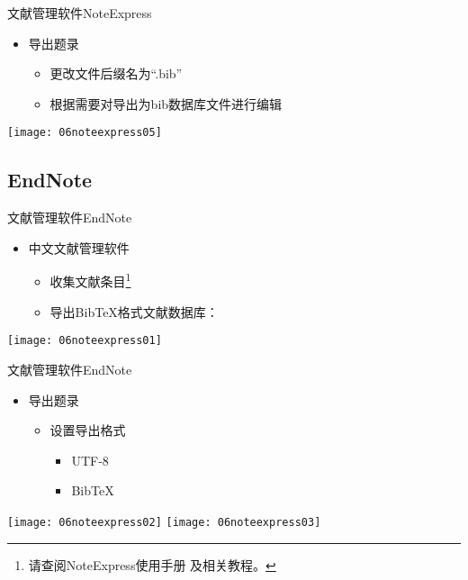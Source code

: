 \documentclass[fontset = none, t]{ctexbeamer}
\begin{document}
\begin{frame}[fragile]{文献管理软件}{NoteExpress}
  \begin{spacing}{1.2}
    \begin{itemize}
    \item 导出题录
      \begin{itemize}
      \item 更改文件后缀名为\enquote{.bib}
      \item 根据需要对导出为bib数据库文件进行编辑
      \end{itemize}
    \end{itemize}    
    \begin{center}
      \texttt{[image: 06noteexpress05]}
    \end{center}
  \end{spacing}
\end{frame}
\subsection[EndNote]{EndNote}
\begin{frame}[fragile]{文献管理软件}{EndNote}
  \begin{spacing}{1.5}
    \begin{itemize}
    \item 中文文献管理软件
      \begin{itemize}
      \item 收集文献条目\footnote[frame, 2]{请查阅NoteExpress使用手册
          及相关教程。}
      \item 导出Bib\TeX 格式文献数据库：
      \end{itemize}
    \end{itemize}    
    \begin{center}
      \texttt{[image: 06noteexpress01]}
    \end{center}
  \end{spacing}
\end{frame}

\begin{frame}[fragile]{文献管理软件}{EndNote}
  \begin{spacing}{1.2}
    \begin{itemize}
    \item 导出题录
      \begin{itemize}
      \item 设置导出格式
        \begin{itemize}
        \item UTF-8
        \item Bib\TeX
        \end{itemize}
      \end{itemize}
    \end{itemize}
    \begin{center}
      \texttt{[image: 06noteexpress02]}
      \texttt{[image: 06noteexpress03]}
    \end{center}
  \end{spacing}
\end{frame}
\end{document}
